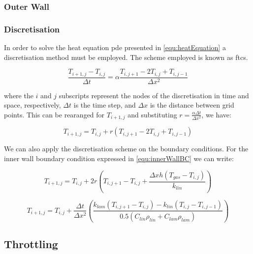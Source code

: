 \subsubsection{Outer Wall}

\subsubsection{Discretisation}

In order to solve the heat equation \gls{pde} presented in \cref{equ:heatEquation} a discretisation method must be employed. The scheme employed is known as \gls{ftcs}. 

\begin{equation}
\frac{T_{i+1,j} - T_{i,j}}{\Delta t} = \alpha \frac{T_{i,j+1}-2T_{i,j} + T_{i,j-1}}{\Delta x^2}
\end{equation}

\noindent where the $i$ and $j$ subscripts represent the nodes of the discretisation in time and space, respectively, $\Delta t$ is the time step, and $\Delta x$ is the distance between grid points. This can be rearanged for $ T_{i+1,j}$ and substituting $r = \frac{\alpha \Delta t}{ \Delta x^2}$, we have:

\begin{equation}
T_{i+1,j}= T_{i,j} +  r \left(T_{i,j+1}-2T_{i,j} + T_{i,j-1} \right)
\end{equation}

We can also apply the discretisation scheme on the boundary conditions. For the inner wall boundary condition expressed in \cref{equ:innerWallBC} we can write:

\begin{equation}
T_{i+1,j}= T_{i,j} + 2r\left(T_{i,j+1} - T_{i,j} + \frac{\Delta x h \left( T_{gas} - T_{i,j}\right) }{k_{lin}}\right)
\end{equation}


\begin{equation}
T_{i+1,j}= T_{i,j} + \frac{\Delta t}{\Delta x^2} \left( \frac{k_{lam} \left(T_{i,j+1} - T_{i,j} \right) - k_{lin} \left(T_{i,j} - T_{i,j-1} \right)}{0.5 \left( C_{lin} \rho_{lin} + C_{lam} \rho_{lam} \right)} \right)
\end{equation}




\subsection{Throttling}


